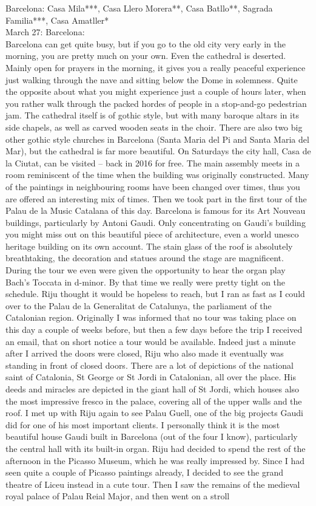 Barcelona: Casa Mila***, Casa Llero Morera**, Casa Batllo**, Sagrada Familia***, Casa Amatller*\\

March 27: Barcelona:\\
Barcelona can get quite busy, but if you go to the old city very early in the morning, you are pretty much on your own. Even the cathedral is deserted. Mainly open for prayers in the morning, it gives you a really peaceful experience just walking through the nave and sitting below the Dome in solemness. Quite the opposite about what you might experience just a couple of hours later, when you rather walk through the packed hordes of people in a stop-and-go pedestrian jam. The cathedral itself is of gothic style, but with many baroque altars in its side chapels, as well as carved wooden seats in the choir. There are also two big other gothic style churches in Barcelona (Santa Maria del Pi and Santa Maria del Mar), but the cathedral is far more beautiful. On Saturdays the city hall, Casa de la Ciutat, can be visited -- back in 2016 for free. The main assembly meets in a room reminiscent of the time when the building was originally constructed. Many of the paintings in neighbouring rooms have been changed over times, thus you are offered an interesting mix of times. Then we took part in the first tour of the Palau de la Music Catalana of this day. Barcelona is famous for its Art Nouveau buildings, particularly by Antoni Gaudi. Only concentrating on Gaudi's building you might miss out on this beautiful piece of architecture, even a world unesco heritage building on its own account. The stain glass of the roof is absolutely breathtaking, the decoration and statues around the stage are magnificent. During the tour we even were given the opportunity to hear the organ play Bach's Toccata in d-minor. By that time we really were pretty tight on the schedule. Riju thought it would be hopeless to reach, but I ran as fast as I could over to the Palau de la Generalitat de Catalunya, the parliament of the Catalonian region. Originally I was informed that no tour was taking place on this day a couple of weeks before, but then a few days before the trip I received an email, that on short notice a tour would be available. Indeed just a minute after I arrived the doors were closed, Riju who also made it eventually was standing in front of closed doors. There are a lot of depictions of the national saint of Catalonia, St George or St Jordi in Catalonian, all over the place. His deeds and miracles are depicted in the giant hall of St Jordi, which houses also the most impressive fresco in the palace, covering all of the upper walls and the roof. I met up with Riju again to see Palau Guell, one of the big projects Gaudi did for one of his most important clients. I personally think it is the most beautiful house Gaudi built in Barcelona (out of the four I know), particularly the central hall with its built-in organ. Riju had decided to spend the rest of the afternoon in the Picasso Museum, which he was really impressed by. Since I had seen quite a couple of Picasso paintings already, I decided to see the grand theatre of Liceu instead in a cute tour. Then I saw the remains of the medieval royal palace of Palau Reial Major, and then went on a stroll 